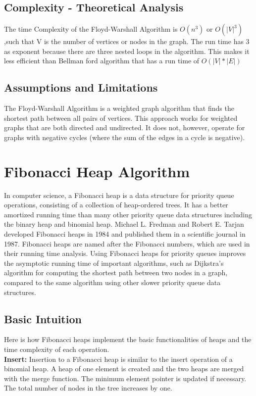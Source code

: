 \documentclass[a4paper, 12pt]{report}
\begin{document}
	\subsection{Complexity - Theoretical Analysis}
	The time Complexity of the Floyd-Warshall Algorithm is $O(n^3)$ or $O(|V|^3)$,such that V is the number of vertices or nodes in the graph. The run time has 3 as exponent because  there are three nested loops in the algorithm. This makes it less efficient than Bellman ford algorithm that has a run time of $O(|V|*|E|)$
	
	\subsection{Assumptions and Limitations}
	The Floyd-Warshall Algorithm is a weighted graph algorithm that finds the shortest path between all pairs of vertices. This approach works for weighted graphs that are both directed and undirected. It does not, however, operate for graphs with negative cycles (where the sum of the edges in a cycle is negative).
	
	\pagebreak
	\section{Fibonacci Heap Algorithm} 
    In computer science, a Fibonacci heap is a data structure for priority queue operations, consisting of a collection of heap-ordered trees. It has a better amortized running time than many other priority queue data structures including the binary heap and binomial heap. Michael L. Fredman and Robert E. Tarjan developed Fibonacci heaps in 1984 and published them in a scientific journal in 1987. Fibonacci heaps are named after the Fibonacci numbers, which are used in their running time analysis. Using Fibonacci heaps for priority queues improves the asymptotic running time of important algorithms, such as Dijkstra's algorithm for computing the shortest path between two nodes in a graph, compared to the same algorithm using other slower priority queue data structures.
	\cite{Fibonacci-Heap} 
	
	\subsection{Basic Intuition}
	Here is how Fibonacci heaps implement the basic functionalities of heaps and the time complexity of each operation.\\
	
	\textbf{Insert: }Insertion to a Fibonacci heap is similar to the insert operation of a binomial heap. A heap of one element is created and the two heaps are merged with the merge function. The minimum element pointer is updated if necessary. The total number of nodes in the tree increases by one.\\
	
\end{document}

